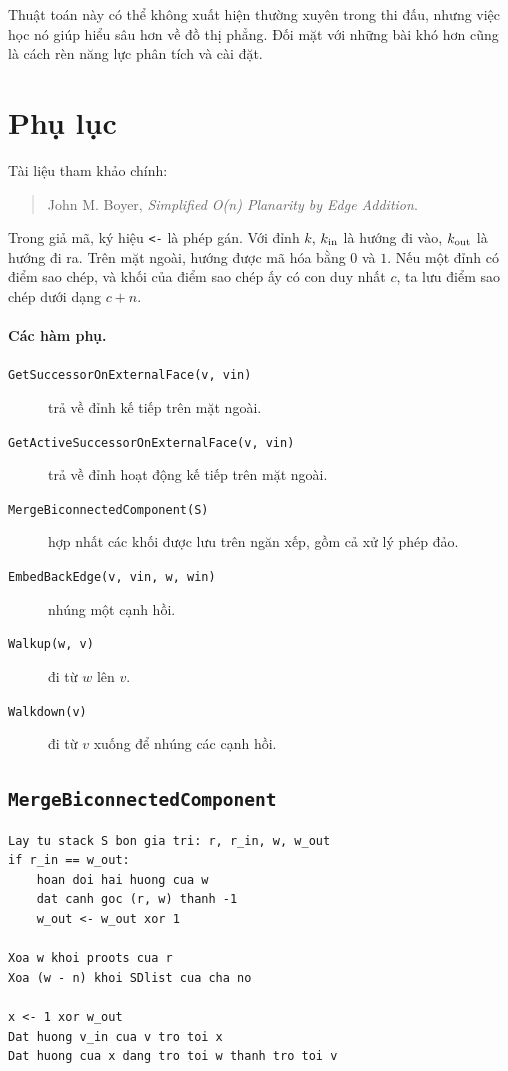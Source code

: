 \documentclass[11pt]{article}
\begin{document}
Thuật toán này có thể không xuất hiện thường xuyên trong thi đấu, nhưng việc
học nó giúp hiểu sâu hơn về đồ thị phẳng. Đối mặt với những bài khó hơn cũng
là cách rèn năng lực phân tích và cài đặt.

\section{Phụ lục}

Tài liệu tham khảo chính:
\begin{quote}
John M. Boyer, \textit{Simplified O(n) Planarity by Edge Addition}.
\end{quote}

Trong giả mã, ký hiệu \texttt{<-} là phép gán. Với đỉnh \(k\), \(k_{\rm in}\)
là hướng đi vào, \(k_{\rm out}\) là hướng đi ra. Trên mặt ngoài, hướng được mã
hóa bằng \(0\) và \(1\). Nếu một đỉnh có điểm sao chép, và khối của điểm sao
chép ấy có con duy nhất \(c\), ta lưu điểm sao chép dưới dạng \(c+n\).

\paragraph{Các hàm phụ.}
\begin{description}
  \item[\texttt{GetSuccessorOnExternalFace(v, vin)}] trả về đỉnh kế tiếp trên
  mặt ngoài.
  \item[\texttt{GetActiveSuccessorOnExternalFace(v, vin)}] trả về đỉnh hoạt
  động kế tiếp trên mặt ngoài.
  \item[\texttt{MergeBiconnectedComponent(S)}] hợp nhất các khối được lưu trên
  ngăn xếp, gồm cả xử lý phép đảo.
  \item[\texttt{EmbedBackEdge(v, vin, w, win)}] nhúng một cạnh hồi.
  \item[\texttt{Walkup(w, v)}] đi từ \(w\) lên \(v\).
  \item[\texttt{Walkdown(v)}] đi từ \(v\) xuống để nhúng các cạnh hồi.
\end{description}

\subsection*{\texttt{MergeBiconnectedComponent}}

\begin{verbatim}
Lay tu stack S bon gia tri: r, r_in, w, w_out
if r_in == w_out:
    hoan doi hai huong cua w
    dat canh goc (r, w) thanh -1
    w_out <- w_out xor 1

Xoa w khoi proots cua r
Xoa (w - n) khoi SDlist cua cha no

x <- 1 xor w_out
Dat huong v_in cua v tro toi x
Dat huong cua x dang tro toi w thanh tro toi v
\end{verbatim}
\end{document}
